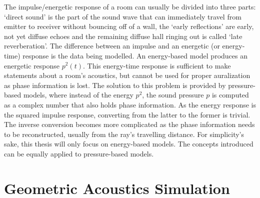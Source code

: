 The impulse/energetic response of a room can usually be divided into three parts:
`direct sound' is the part of the sound wave that can immediately travel from emitter to receiver without bouncing off of a wall,
the `early reflections' are early, not yet diffuse echoes
and the remaining diffuse hall ringing out is called `late reverberation'.
\newline
The difference between an impulse and an energetic (or energy-time) response is the data being modelled.
An energy-based model produces an energetic response \(p^2(t)\).
This energy-time response is sufficient to make statements about a room's acoustics,
but cannot be used for proper auralization as phase information is lost.
The solution to this problem is provided by pressure-based models,
where instead of the energy \(p^2\),
the sound pressure \(p\) is computed as a complex number that also holds phase information.
\newline
As the energy response is the squared impulse response,
converting from the latter to the former is trivial.
The inverse conversion becomes more complicated as the phase information needs to be reconstructed,
usually from the ray's travelling distance.
\newline
For simplicity's sake, this thesis will only focus on energy-based models.
The concepts introduced can be equally applied to pressure-based models.

\section{Geometric Acoustics Simulation}\label{sec:FundamentalGA}

